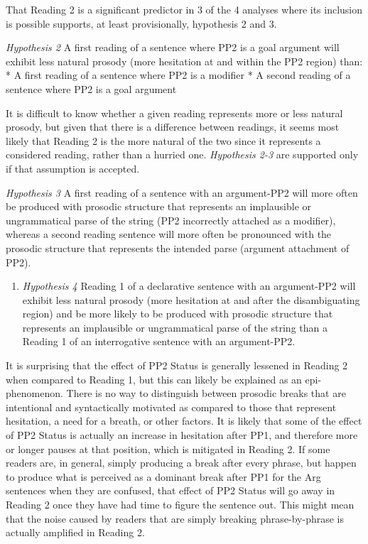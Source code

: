 \documentclass[12pt,oneside]{book}
\providecommand{\tightlist}{%
  \setlength{\itemsep}{0pt}\setlength{\parskip}{0pt}}
\begin{document}
That Reading 2 is a significant predictor in 3 of the 4 analyses where its inclusion is possible supports, at least provisionally, hypothesis 2 and 3.

\emph{Hypothesis 2} \hfill\linebreak
A first reading of a sentence where PP2 is a goal argument will exhibit less natural prosody (more hesitation at and within the PP2 region) than:
* A first reading of a sentence where PP2 is a modifier
* A second reading of a sentence where PP2 is a goal argument

It is difficult to know whether a given reading represents more or less natural prosody, but given that there is a difference between readings, it seems most likely that Reading 2 is the more natural of the two since it represents a considered reading, rather than a hurried one. \emph{Hypothesis 2-3} are supported only if that assumption is accepted.

\emph{Hypothesis 3} \linebreak
A first reading of a sentence with an argument-PP2 will more often be produced with prosodic structure that represents an implausible or ungrammatical parse of the string (PP2 incorrectly attached as a modifier), whereas a second reading sentence will more often be pronounced with the prosodic structure that represents the intended parse (argument attachment of PP2).

\begin{enumerate}
\def\labelenumi{(\arabic{enumi})}
\setcounter{enumi}{47}
\tightlist
\item
  \emph{Hypothesis 4} \linebreak
  Reading 1 of a declarative sentence with an argument-PP2 will exhibit less natural prosody (more hesitation at and after the disambiguating region) and be more likely to be produced with prosodic structure that represents an implausible or ungrammatical parse of the string than a Reading 1 of an interrogative sentence with an argument-PP2.
\end{enumerate}

It is surprising that the effect of PP2 Status is generally lessened in Reading 2 when compared to Reading 1, but this can likely be explained as an epi-phenomenon. There is no way to distinguish between prosodic breaks that are intentional and syntactically motivated as compared to those that represent hesitation, a need for a breath, or other factors. It is likely that some of the effect of PP2 Status is actually an increase in hesitation after PP1, and therefore more or longer pauses at that position, which is mitigated in Reading 2. If some readers are, in general, simply producing a break after every phrase, but happen to produce what is perceived as a dominant break after PP1 for the Arg sentences when they are confused, that effect of PP2 Status will go away in Reading 2 once they have had time to figure the sentence out. This might mean that the noise caused by readers that are simply breaking phrase-by-phrase is actually amplified in Reading 2.
\end{document}
